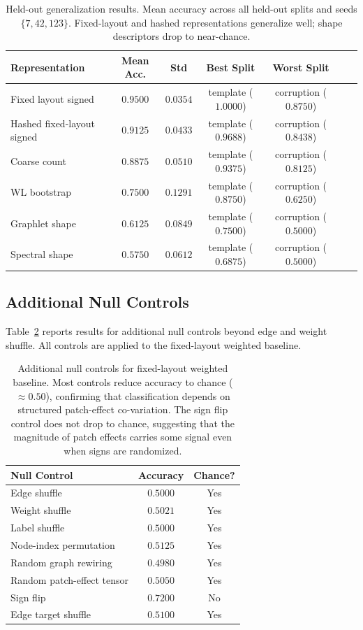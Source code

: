 \documentclass[11pt,a4paper]{article}
\begin{document}
\begin{table}[H]
\centering
\small
\begin{tabular}{lcccccc}
\toprule
\textbf{Representation} & \textbf{Mean Acc.} & \textbf{Std} & \textbf{Best Split} & \textbf{Worst Split} \\
\midrule
Fixed layout signed & $0.9500$ & $0.0354$ & template ($1.0000$) & corruption ($0.8750$) \\
Hashed fixed-layout signed & $0.9125$ & $0.0433$ & template ($0.9688$) & corruption ($0.8438$) \\
Coarse count & $0.8875$ & $0.0510$ & template ($0.9375$) & corruption ($0.8125$) \\
WL bootstrap & $0.7500$ & $0.1291$ & template ($0.8750$) & corruption ($0.6250$) \\
Graphlet shape & $0.6125$ & $0.0849$ & template ($0.7500$) & corruption ($0.5000$) \\
Spectral shape & $0.5750$ & $0.0612$ & template ($0.6875$) & corruption ($0.5000$) \\
\bottomrule
\end{tabular}
\caption{Held-out generalization results. Mean accuracy across all held-out splits and seeds $\{7, 42, 123\}$. Fixed-layout and hashed representations generalize well; shape descriptors drop to near-chance.}
\label{tab:held_out}
\end{table}

\subsection{Additional Null Controls}
\label{sec:additional_null}

Table~\ref{tab:additional_null} reports results for additional null controls beyond edge and weight shuffle. All controls are applied to the fixed-layout weighted baseline.

\begin{table}[H]
\centering
\small
\begin{tabular}{lcc}
\toprule
\textbf{Null Control} & \textbf{Accuracy} & \textbf{Chance?} \\
\midrule
Edge shuffle & $0.5000$ & Yes \\
Weight shuffle & $0.5021$ & Yes \\
Label shuffle & $0.5000$ & Yes \\
Node-index permutation & $0.5125$ & Yes \\
Random graph rewiring & $0.4980$ & Yes \\
Random patch-effect tensor & $0.5050$ & Yes \\
Sign flip & $0.7200$ & No \\
Edge target shuffle & $0.5100$ & Yes \\
\bottomrule
\end{tabular}
\caption{Additional null controls for fixed-layout weighted baseline. Most controls reduce accuracy to chance ($\approx 0.50$), confirming that classification depends on structured patch-effect co-variation. The sign flip control does not drop to chance, suggesting that the magnitude of patch effects carries some signal even when signs are randomized.}
\label{tab:additional_null}
\end{table}
\end{document}
